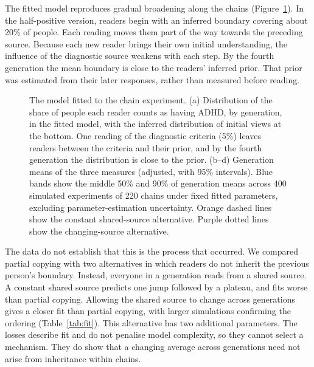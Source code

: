 \documentclass[11pt]{article}
\begin{document}
The fitted model reproduces gradual broadening along the chains (Figure~\ref{fig:mech}). In the half-positive version, readers begin with an inferred boundary covering about 20\% of people. Each reading moves them part of the way towards the preceding source. Because each new reader brings their own initial understanding, the influence of the diagnostic source weakens with each step. By the fourth generation the mean boundary is close to the readers' inferred prior. That prior was estimated from their later responses, rather than measured before reading.

\begin{figure}[tbp]
\centering
\resizebox{0.92\textwidth}{!}{\figmech}
\caption{The model fitted to the chain experiment. (a) Distribution of the share of people each reader counts as having ADHD, by generation, in the fitted model, with the inferred distribution of initial views at the bottom. One reading of the diagnostic criteria (5\%) leaves readers between the criteria and their prior, and by the fourth generation the distribution is close to the prior. (b--d) Generation means of the three measures (adjusted, with 95\% intervals). Blue bands show the middle 50\% and 90\% of generation means across 400 simulated experiments of 220 chains under fixed fitted parameters, excluding parameter-estimation uncertainty. Orange dashed lines show the constant shared-source alternative. Purple dotted lines show the changing-source alternative.}
\label{fig:mech}
\end{figure}

The data do not establish that this is the process that occurred. We compared partial copying with two alternatives in which readers do not inherit the previous person's boundary. Instead, everyone in a generation reads from a shared source. A constant shared source predicts one jump followed by a plateau, and fits worse than partial copying. Allowing the shared source to change across generations gives a closer fit than partial copying, with larger simulations confirming the ordering (Table~\ref{tab:fit}). This alternative has two additional parameters. The losses describe fit and do not penalise model complexity, so they cannot select a mechanism. They do show that a changing average across generations need not arise from inheritance within chains.
\end{document}
